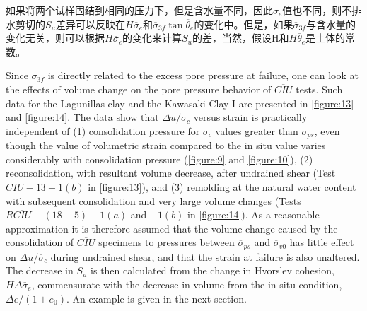 \begin{paracol}{2}
    \switchcolumn

    \noindent{}如果将两个试样固结到相同的压力下，但是含水量不同，因此$\overline{\sigma}_e$值也不同，则不排水剪切的$S_u$差异可以反映在$H\overline{\sigma}_e$和$\overline{\sigma}_{3f}\tan\overline{\theta}_e$的变化中。但是，如果$\overline{\sigma}_{3f}$与含水量的变化无关，则可以根据$H\overline{\sigma}_e$的变化来计算$S_u$的差，当然，假设H和$H\overline{\theta}_e$是土体的常数。

\end{paracol}
    


\begin{paracol}{2}

    Since $\overline{\sigma}_{3f}$ is directly related to the excess pore pressure at failure, one can look at the effects of volume change on the pore pressure behavior of $\overline{CIU}$ tests. Such data for the Lagunillas clay and the Kawasaki Clay I are presented in \autoref{figure:13} and \autoref{figure:14}. The data show that $\Delta{}u/\overline{\sigma}_c$ versus strain is practically independent of (1) consolidation pressure for $\overline{\sigma}_c$ values greater than $\overline{\sigma}_{ps}$, even though the value of volumetric strain compared to the in situ value varies considerably with consolidation pressure (\autoref{figure:9} and \autoref{figure:10}), (2) reconsolidation, with resultant volume decrease, after undrained shear (Test $\overline{CIU}-13-1(b)$ in \autoref{figure:13}), and (3) remolding at the natural water content with subsequent consolidation and very large volume changes (Tests $R\overline{CIU}-(18-5)-1(a)$ and $-1(b)$ in \autoref{figure:14}). As a reasonable approximation it is therefore assumed that the volume change caused by the consolidation of $\overline{CIU}$ specimens to pressures between $\overline{\sigma}_{ps}$ and $\overline{\sigma}_{v0}$ has little effect on $\Delta{}u/\overline{\sigma}_c$ during undrained shear, and that the strain at failure is also unaltered. The decrease in $S_u$ is then calculated from the change in Hvorslev cohesion, $H\Delta{}\overline{\sigma}_e$, commensurate with the decrease in volume from the in situ condition, $\Delta{}e/(1+e_0)$. An example is given in the next section.

    \switchcolumn


\end{paracol}
